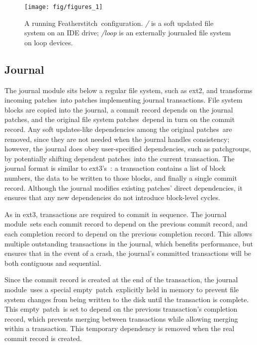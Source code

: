 \documentclass[9pt,twocolumn,letterpaper]{article}
\newcommand{\Kudos}{Featherstitch}
\newcommand{\patch}{patch}
\newcommand{\patches}{patches}
\newcommand{\module}{module}
\newcommand{\patchgroups}{patchgroups}
\newcommand{\noop}{empty}
\begin{document}
\begin{figure}[t]
  \centering
  \texttt{[image: fig/figures\_1]}
  \caption{A running \Kudos\ configuration. {\it/} is a soft updated
    file system on an IDE drive; {\it/loop} is an externally journaled
    file system on loop devices.}
  \label{fig:kfs-graph}
\end{figure}



\subsection{Journal}
\label{sec:modules:journal}

The journal module sits below a regular file system, such as ext2, and transforms
incoming \patches\ into patches implementing journal transactions.
%
File system blocks are copied into the journal, a commit record depends on the
journal \patches, and the original file system \patches\ depend in turn on the
commit record.
%
Any soft updates-like dependencies among the original \patches\ are removed,
since they are not needed when the journal handles consistency; however, the
journal does obey user-specified dependencies, such as
\patchgroups, by potentially shifting dependent \patches\ into the current
transaction.
%
%
The journal format is similar to ext3's~\cite{tweedie98journaling}: a
transaction contains a list of block numbers, the data to be written to
those blocks, and finally a single commit record.
%
Although the journal modifies existing \patches' direct dependencies, it
ensures that any new dependencies do not introduce block-level
cycles.

As in ext3, transactions are required to commit in sequence. The
journal \module\ sets each commit record to depend on the previous commit record, and each
completion record to depend on the previous completion record. This allows
multiple outstanding transactions in the journal, which benefits performance,
but ensures that in the event of a crash, the journal's committed
transactions will be both contiguous and sequential.

Since the commit record is created at the end of the transaction, the journal
\module\ uses a special \noop\ \patch\ explicitly held in memory to prevent
file system changes from being written to the disk until the transaction is
complete. This \noop\ \patch\ is set to depend on the previous transaction's
completion record, which prevents merging between transactions while allowing
merging within a transaction. This temporary dependency is removed when the
real commit record is created.
\end{document}
